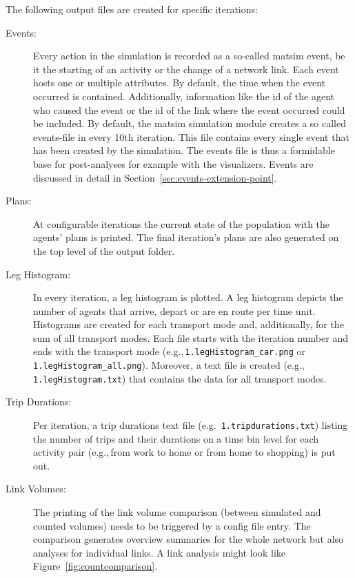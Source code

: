 The following output files are created for specific iterations:
\begin{description}

\item[Events:] Every action in the simulation is recorded as a so-called \gls{matsim} \gls{event}, be it the starting of an activity or the change of a network link. Each \gls{event} hosts one or multiple attributes. By default, the time when the \gls{event} occurred is contained. Additionally, information like the id of the agent who caused the event or the id of the link where the \gls{event} occurred could be included. By default, the \gls{matsim} simulation module creates a so called events-file in every 10th iteration. This file contains every single \gls{event} that has been created by the simulation. The events file is thus a formidable base for post-analyses for example with the visualizers. Events are discussed in detail in Section~\ref{sec:events-extension-point}.

\item[Plans:] At configurable iterations the current state of the population with the agents' plans is printed.
%
The final iteration's plans 
are also generated on the top level of the output folder.

\item[Leg Histogram:]
In every iteration, a leg histogram is plotted. A leg histogram depicts the number of agents that arrive, depart or are en route per time unit. Histograms are created for each transport mode and, additionally, for the sum of all transport modes. Each file starts with the iteration number and ends with the transport mode (e.g.,\,\lstinline|1.legHistogram_car.png| or \lstinline|1.legHistogram_all.png|). Moreover, a text file is created (e.g.,\,\lstinline|1.legHistogram.txt|) that contains the data for all transport modes.

\item[Trip Durations:]
Per iteration, a \gls{trip} durations text file (e.g.\ \lstinline|1.tripdurations.txt|) listing the number of trips and their durations on a time bin level for each activity pair (e.g.,\,from work to home or from home to shopping) is put out.

\item[Link Volumes:]
The printing of the link volume comparison (between simulated and counted volumes) needs to be triggered by a config file entry. The comparison generates overview summaries for the whole network but also analyses for individual links. A link analysis might look like Figure~\ref{fig:countcomparison}.

\end{description}

